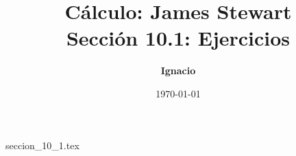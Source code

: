 \documentclass[11pt,spanish,oneside]{report}
\title{\textbf{Cálculo: James Stewart} \\ \Large Sección 10.1: Ejercicios}
\author{\textbf{Ignacio}}
\date{\today}
\begin{document}
\maketitle

{seccion_10_1.tex}
\end{document}
